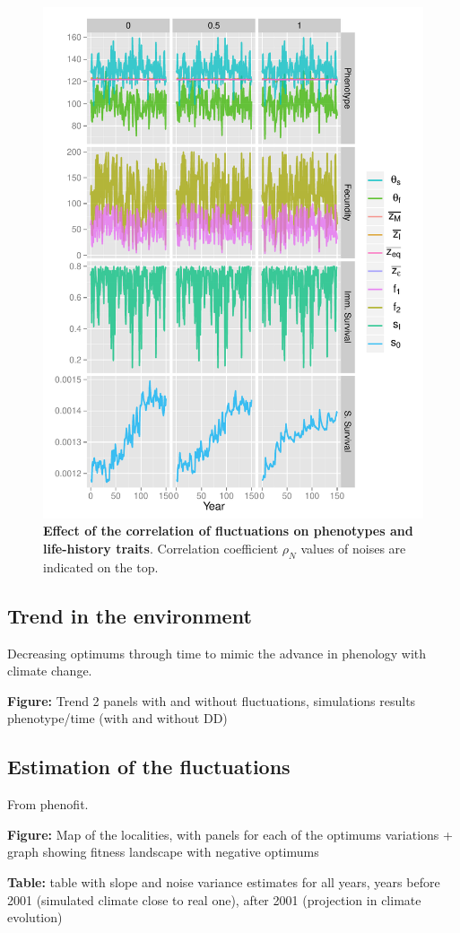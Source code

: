 \begin{figure}[ht!]
	\centering
	\label{fig:corr}
	\includegraphics[scale=1]{Figures/Figure2.pdf}
	\caption{\textbf{Effect of the correlation of fluctuations on phenotypes and life-history traits}. Correlation coefficient $\rho_{N}$ values of noises are indicated on the top.}
\end{figure}

\subsection*{Trend in the environment}

Decreasing optimums through time to mimic the advance in phenology with climate change.

\textbf{Figure:} Trend 2 panels with and without fluctuations, simulations results phenotype/time (with and without DD)

\subsection*{Estimation of the fluctuations}

From phenofit.

\textbf{Figure:} Map of the localities, with panels for each of the optimums variations + graph showing fitness landscape with negative optimums

\textbf{Table:} table with slope and noise variance estimates for all years, years before 2001 (simulated climate close to real one), after 2001 (projection in climate evolution)